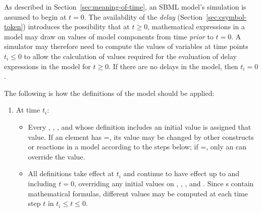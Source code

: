 As described in Section~\ref{sec:meaning-of-time}, an SBML model's
simulation is assumed to begin at $t = 0$.  The availability of
the \emph{delay}  (Section~\ref{sec:csymbol-token})
introduces the possibility that at $t \geq 0$, mathematical
expressions in a model may draw on values of model components from
time \emph{prior} to $t = 0$.  A simulator may therefore need to
compute the values of variables at time points $t_i \leq 0$ to
allow the calculation of values required for the evaluation of
delay expressions in the model for $t \geq 0$.  If there are no
delays in the model, then $t_i = 0$.

The following is how the definitions of the model should be
applied:


\begin{enumerate}

\item At time $t_i$:
  \begin{itemize}
    
  \item Every \Species, \SpeciesReference, \Compartment, and \Parameter whose
    definition includes an initial value is assigned that value.
    If an element has =, its
    value may be changed by other constructs or reactions in a
    model according to the steps below; if
    =, only an \InitialAssignment can
    override the value.
    
  \item All \InitialAssignment definitions take effect at $t_i$
    and continue to have effect up to and including $t = 0$,
    overriding any initial values on \Species, \SpeciesReference,
    \Compartment, and \Parameter.  Since \InitialAssignment{}s
    contain mathematical formulas, different values may be
    computed at each time step $t$ in $t_i \leq t \leq 0$.



\end{itemize}
\end{enumerate}
